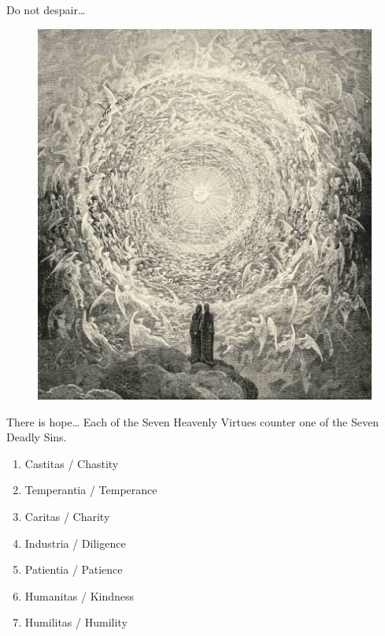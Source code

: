 \documentclass[12pt,xcolor=x11names]{beamer}
\begin{document}
\begin{frame}{Do not despair\ldots}
    \begin{figure}
        \centering \includegraphics[height=0.75\textheight]{images/hope.jpg}
    \end{figure}
\end{frame}

\begin{frame}{There is hope\ldots}
    Each of the Seven Heavenly Virtues counter one of the Seven Deadly Sins.
    \begin{enumerate}
        \item Castitas / Chastity
        \item Temperantia / Temperance
        \item Caritas / Charity
        \item Industria / Diligence
        \item Patientia / Patience
        \item Humanitas / Kindness
        \item Humilitas / Humility
    \end{enumerate}
\end{frame}
\end{document}
